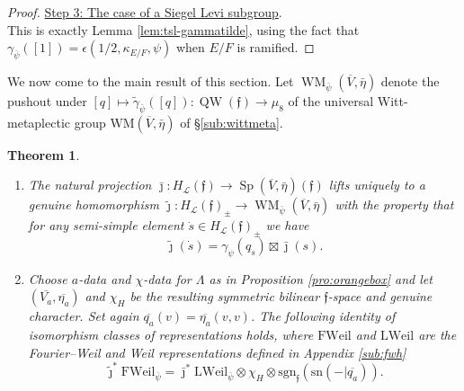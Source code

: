\documentclass{article}
\def\mc#1{\mathcal{#1}}
\def\ol#1{\overline{#1}}
\def\ul#1{\underline{#1}}
\DeclareMathOperator{\Sp}{Sp}
\newtheorem{thm}{Theorem}[subsection]
\theoremstyle{definition}
\numberwithin{equation}{subsection}
\renewcommand{\-}{\hyp{}}
\DeclareMathOperator{\WM}{WM}
\newcommand{\WMuniv}{\mathrm{WM}}
\DeclareMathOperator{\QW}{QW}
\newcommand{\rf}{\mathfrak{f}}
\newcommand{\oVS}{\overline{V}}
\begin{document}
\begin{proof}
	

	\ul{Step 3: The case of a Siegel Levi subgroup}.\\
	This is exactly Lemma \ref{lem:tsl-gammatilde}, using the fact that $\gamma_{\ol{\psi}}([1])=\epsilon(1/2,\kappa_{E/F},\psi)$ when $E/F$ is ramified.
\end{proof}

We now come to the main result of this section. Let $\WM_{\bar\psi}(\oVS,\bar\eta)$\index[notation]{WMpsibar@$\WM_{\bar\psi}$} denote the pushout under $[q] \mapsto \tilde\gamma_{\bar\psi}([q]) : \QW(\rf) \to \mu_8$ 
of the universal Witt-metaplectic group $\WMuniv(\oVS,\bar\eta)$ of \S\ref{sub:wittmeta}.


\begin{thm}\ \\[-20pt] \label{thm:symplectic-main}
	\begin{enumerate}
		\item The natural projection $\bar\jmath : H_\mc{L}(\rf) \to \Sp(\oVS,\bar\eta)(\rf)$ lifts uniquely to a genuine homomorphism $\tilde\jmath : H_\mc{L}(\rf)_\pm \to \WM_{\bar\psi}(\oVS,\bar\eta)$ with the property that for any semi-simple element $\dot s \in H_\mc{L}(\rf)_\pm$ we have
	\[ \tilde\jmath(\dot s) = \gamma_\psi(q_{\dot s}) \boxtimes \bar\jmath(s). \]
		\item Choose $a$-data and $\chi$-data for $\Lambda$ as in Proposition \ref{pro:orangebox} and let $(\ol{V_a},\ol{\eta_a})$ and $\chi_H$ be the resulting symmetric bilinear $\rf$-space and genuine character. Set again $\ol{q_a}(v)=\ol{\eta_a}(v,v)$. The following identity of isomorphism classes of representations holds, where $\mathrm{FWeil}$ and $\mathrm{LWeil}$ are the Fourier--Weil and Weil representations defined in Appendix \ref{sub:fwh}\[ \tilde\jmath^*\mathrm{FWeil}_{\bar\psi} = \bar\jmath^*\mathrm{LWeil}_{\bar\psi} \otimes \chi_H \otimes \mathrm{sgn}_\rf(\mathrm{sn}(-|\ol{q_a})). \]
\end{enumerate}
	
\end{thm}
\end{document}
